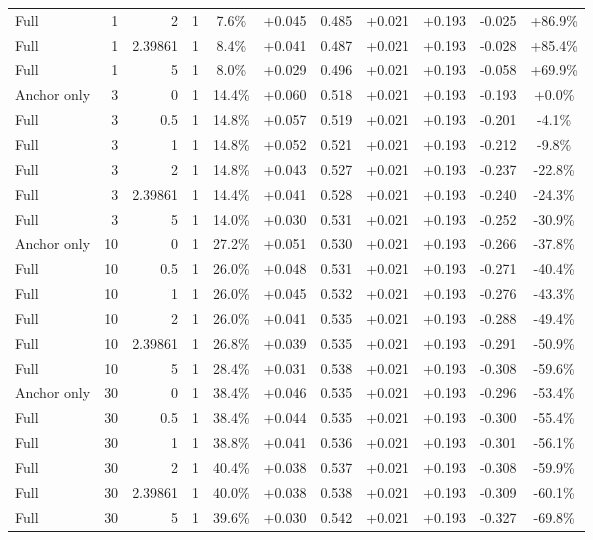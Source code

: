 \begin{table}[htbp]
\begin{tabular}{lrrrccccccc}
Full & 1 & 2 & 1 & 7.6\% & +0.045 & 0.485 & +0.021 & +0.193 & -0.025 & +86.9\% \\
Full & 1 & 2.39861 & 1 & 8.4\% & +0.041 & 0.487 & +0.021 & +0.193 & -0.028 & +85.4\% \\
Full & 1 & 5 & 1 & 8.0\% & +0.029 & 0.496 & +0.021 & +0.193 & -0.058 & +69.9\% \\
Anchor only & 3 & 0 & 1 & 14.4\% & +0.060 & 0.518 & +0.021 & +0.193 & -0.193 & +0.0\% \\
Full & 3 & 0.5 & 1 & 14.8\% & +0.057 & 0.519 & +0.021 & +0.193 & -0.201 & -4.1\% \\
Full & 3 & 1 & 1 & 14.8\% & +0.052 & 0.521 & +0.021 & +0.193 & -0.212 & -9.8\% \\
Full & 3 & 2 & 1 & 14.8\% & +0.043 & 0.527 & +0.021 & +0.193 & -0.237 & -22.8\% \\
Full & 3 & 2.39861 & 1 & 14.4\% & +0.041 & 0.528 & +0.021 & +0.193 & -0.240 & -24.3\% \\
Full & 3 & 5 & 1 & 14.0\% & +0.030 & 0.531 & +0.021 & +0.193 & -0.252 & -30.9\% \\
Anchor only & 10 & 0 & 1 & 27.2\% & +0.051 & 0.530 & +0.021 & +0.193 & -0.266 & -37.8\% \\
Full & 10 & 0.5 & 1 & 26.0\% & +0.048 & 0.531 & +0.021 & +0.193 & -0.271 & -40.4\% \\
Full & 10 & 1 & 1 & 26.0\% & +0.045 & 0.532 & +0.021 & +0.193 & -0.276 & -43.3\% \\
Full & 10 & 2 & 1 & 26.0\% & +0.041 & 0.535 & +0.021 & +0.193 & -0.288 & -49.4\% \\
Full & 10 & 2.39861 & 1 & 26.8\% & +0.039 & 0.535 & +0.021 & +0.193 & -0.291 & -50.9\% \\
Full & 10 & 5 & 1 & 28.4\% & +0.031 & 0.538 & +0.021 & +0.193 & -0.308 & -59.6\% \\
Anchor only & 30 & 0 & 1 & 38.4\% & +0.046 & 0.535 & +0.021 & +0.193 & -0.296 & -53.4\% \\
Full & 30 & 0.5 & 1 & 38.4\% & +0.044 & 0.535 & +0.021 & +0.193 & -0.300 & -55.4\% \\
Full & 30 & 1 & 1 & 38.8\% & +0.041 & 0.536 & +0.021 & +0.193 & -0.301 & -56.1\% \\
Full & 30 & 2 & 1 & 40.4\% & +0.038 & 0.537 & +0.021 & +0.193 & -0.308 & -59.9\% \\
Full & 30 & 2.39861 & 1 & 40.0\% & +0.038 & 0.538 & +0.021 & +0.193 & -0.309 & -60.1\% \\
Full & 30 & 5 & 1 & 39.6\% & +0.030 & 0.542 & +0.021 & +0.193 & -0.327 & -69.8\% \\

\end{tabular}
\end{table}
